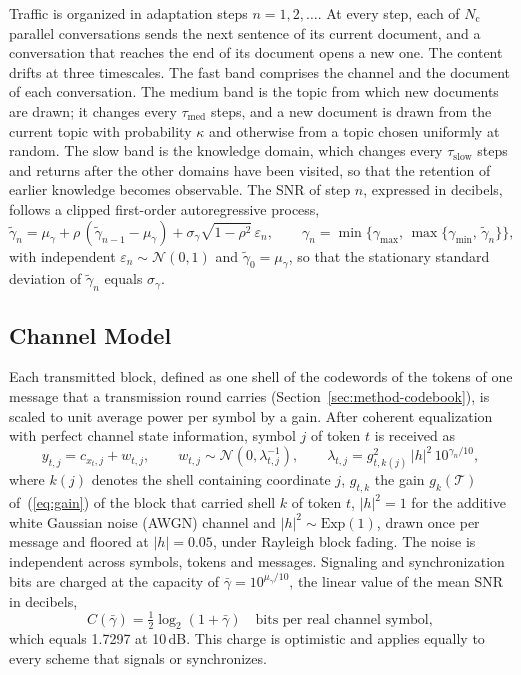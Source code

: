 Traffic is organized in adaptation steps $n = 1, 2, \dots$. At every step, each of $N_\mathrm{c}$ parallel conversations sends the next sentence of its current document, and a conversation that reaches the end of its document opens a new one. The content drifts at three timescales. The fast band comprises the channel and the document of each conversation. The medium band is the topic from which new documents are drawn; it changes every $\tau_\mathrm{med}$ steps, and a new document is drawn from the current topic with probability $\kappa$ and otherwise from a topic chosen uniformly at random. The slow band is the knowledge domain, which changes every $\tau_\mathrm{slow}$ steps and returns after the other domains have been visited, so that the retention of earlier knowledge becomes observable. The SNR of step $n$, expressed in decibels, follows a clipped first-order autoregressive process,
\begin{equation}
\tilde{\gamma}_n = \mu_\gamma + \rho\,(\tilde{\gamma}_{n-1}-\mu_\gamma) + \sigma_\gamma\sqrt{1-\rho^2}\,\varepsilon_n,
\qquad \gamma_n = \min\bigl\{\gamma_{\max},\,\max\{\gamma_{\min},\,\tilde{\gamma}_n\}\bigr\},
\label{eq:snr}
\end{equation}
with independent $\varepsilon_n\sim\mathcal{N}(0,1)$ and $\tilde{\gamma}_0 = \mu_\gamma$, so that the stationary standard deviation of $\tilde{\gamma}_n$ equals $\sigma_\gamma$.

\subsection{Channel Model}
\label{sec:system-channel}

Each transmitted block, defined as one shell of the codewords of the tokens of one message that a transmission round carries (Section~\ref{sec:method-codebook}), is scaled to unit average power per symbol by a gain. After coherent equalization with perfect channel state information, symbol $j$ of token $t$ is received as
\begin{equation}
y_{t,j} = c_{x_t,j} + w_{t,j},\qquad w_{t,j}\sim\mathcal{N}\!\left(0,\lambda_{t,j}^{-1}\right),\qquad \lambda_{t,j} = g_{t,k(j)}^2\,|h|^2\,10^{\gamma_n/10},
\label{eq:channel}
\end{equation}
where $k(j)$ denotes the shell containing coordinate $j$, $g_{t,k}$ the gain $g_k(\mathcal{T})$ of~(\ref{eq:gain}) of the block that carried shell $k$ of token $t$, $|h|^2 = 1$ for the additive white Gaussian noise (AWGN) channel and $|h|^2\sim\mathrm{Exp}(1)$, drawn once per message and floored at $|h| = 0.05$, under Rayleigh block fading. The noise is independent across symbols, tokens and messages. Signaling and synchronization bits are charged at the capacity of $\bar{\gamma} = 10^{\mu_\gamma/10}$, the linear value of the mean SNR in decibels,
\begin{equation}
C(\bar{\gamma}) = \tfrac{1}{2}\log_2(1+\bar{\gamma})\quad\text{bits per real channel symbol},
\label{eq:capacity}
\end{equation}
which equals 1.7297 at 10\,dB. This charge is optimistic and applies equally to every scheme that signals or synchronizes.

